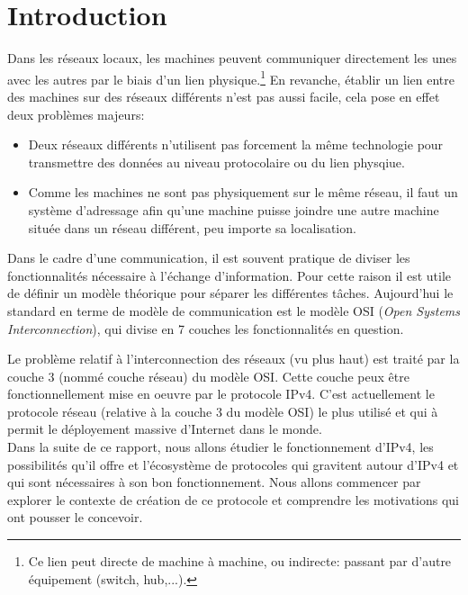 \section{Introduction}
\label{sec:intro}

Dans les réseaux locaux, les machines peuvent communiquer directement les unes
avec les autres par le biais d'un lien physique.\footnote{Ce lien peut directe
de machine à machine, ou indirecte: passant par d'autre équipement (switch,
hub,...).} En revanche, établir un lien entre des machines sur des réseaux
différents n'est pas aussi facile, cela pose en effet deux problèmes majeurs:
\begin{itemize}
\item Deux réseaux différents n'utilisent pas forcement la même technologie
pour transmettre des données au niveau protocolaire ou du lien physqiue.
\item Comme les machines ne sont pas physiquement sur le même réseau, il faut
un système d'adressage afin qu'une machine puisse joindre une autre machine
située dans un réseau différent, peu importe sa localisation.
\end{itemize}
Dans le cadre d'une communication, il est souvent pratique de diviser les
fonctionnalités nécessaire à l'échange d'information.  Pour cette raison il est
utile de définir un modèle théorique pour séparer les différentes tâches.
Aujourd'hui le standard en terme de modèle de communication est le modèle OSI
({\it Open Systems Interconnection}), qui divise en 7 couches les
fonctionnalités en question.

\bigskip
Le problème relatif à l'interconnection des réseaux (vu plus haut) est traité
par la couche 3 (nommé couche réseau) du modèle OSI.
Cette couche peux être fonctionnellement mise en oeuvre par le protocole IPv4.
C'est actuellement le protocole réseau (relative à la couche 3 du modèle OSI)
le plus utilisé et qui à permit le déployement massive d'Internet dans le
monde.\\
Dans la suite de ce rapport, nous allons étudier le fonctionnement d'IPv4, les
possibilités qu'il offre et l'écosystème de protocoles qui gravitent autour
d'IPv4 et qui sont nécessaires à son bon fonctionnement.  Nous allons commencer
par explorer le contexte de création de ce protocole et comprendre les
motivations qui ont pousser le concevoir.


